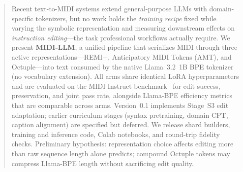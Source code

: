 \begin{abstract}
Recent text-to-MIDI systems extend general-purpose LLMs with domain-specific tokenizers, but no work holds the \emph{training recipe} fixed while varying the symbolic representation and measuring downstream effects on \emph{instruction editing}---the task professional workflows actually require. We present \textbf{MIDI-LLM}, a unified pipeline that serializes MIDI through three active representations---REMI+, Anticipatory MIDI Tokens (AMT), and Octuple---into text consumed by the native Llama~3.2~1B BPE tokenizer (no vocabulary extension). All arms share identical LoRA hyperparameters and are evaluated on the MIDI-Instruct benchmark~\cite{goh2026midiinstruct} for edit success, preservation, and joint pass rate, alongside Llama-BPE efficiency metrics that are comparable across arms. Version~0.1 implements Stage~S3 edit adaptation; earlier curriculum stages (syntax pretraining, domain CPT, caption alignment) are specified but deferred. We release shard builders, training and inference code, Colab notebooks, and round-trip fidelity checks. Preliminary hypothesis: representation choice affects editing more than raw sequence length alone predicts; compound Octuple tokens may compress Llama-BPE length without sacrificing edit quality.
\end{abstract}
